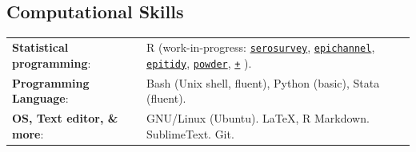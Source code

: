 \documentclass[margin,line]{res}
\begin{document}
\begin{resume}
\section{\sc Computational Skills}
\begin{tabular}{ l l}
	{\bf Statistical programming}: & R (work-in-progress: %
	\href{https://avallecam.github.io/serosurvey/}{\texttt{serosurvey}}, 
	\href{https://github.com/avallecam/epichannel}{\texttt{epichannel}}, 
	\href{https://github.com/avallecam/epitidy}{\texttt{epitidy}}, 
	\href{https://github.com/avallecam/powder}{\texttt{powder}}, 
	\href{https://github.com/avallecam?tab=repositories}{\texttt{+}}%
	).\\ 
	{\bf Programming Language}: & Bash (Unix shell, fluent), Python (basic), Stata (fluent).\\ %
	{\bf OS, Text editor, \& more}: & GNU/Linux (Ubuntu). \LaTeX, R Markdown. SublimeText. Git.\\ %
\end{tabular}


\end{resume}
\end{document}
